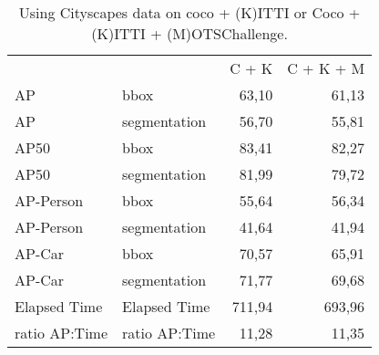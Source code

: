 \documentclass[12pt,a4paper,twocolumn,twoside]{article}
\begin{document}
\begin{table*}[]
\centering
\begin{tabularx}{\textwidth}{|l|l|r|r|} \cline{1-4}
              &               & \multicolumn{1}{l|}{C + K} & \multicolumn{1}{l|}{C + K + M} \\ \cline{1-4}
AP            & bbox          & 63,10                      & 61,13                          \\ \cline{1-4}
AP            & segmentation  & 56,70                      & 55,81                          \\ \cline{1-4}
AP50          & bbox          & 83,41                      & 82,27                          \\ \cline{1-4}
AP50          & segmentation  & 81,99                      & 79,72                          \\ \cline{1-4}
AP-Person     & bbox          & 55,64                      & 56,34                          \\ \cline{1-4}
AP-Person     & segmentation  & 41,64                      & 41,94                          \\ \cline{1-4}
AP-Car        & bbox          & 70,57                      & 65,91                          \\ \cline{1-4}
AP-Car        & segmentation  & 71,77                      & 69,68                          \\ \cline{1-4}
Elapsed Time  & Elapsed Time  & 711,94                     & 693,96                         \\ \cline{1-4}
ratio AP:Time & ratio AP:Time & 11,28                      & 11,35                          \\ \cline{1-4} 
\end{tabularx}
\caption{\label{table:task_b_coco_cityscapes_kittimots_motschallenge}Using Cityscapes data on coco + (K)ITTI or Coco + (K)ITTI + (M)OTSChallenge.}
\end{table*}

  
  \newpage
  \clearpage
\printbibliography
\end{document}
